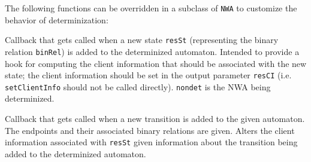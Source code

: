 The following functions can be overridden in a subclass of \texttt{NWA} to
customize the behavior of determinization:
\begin{functionlist}
  Callback that gets called when a new state \texttt{resSt} (representing the
  binary relation \texttt{binRel}) is added to the determinized automaton.
  Intended to provide a hook for computing the client information that should
  be associated with the new state; the client information should be set in
  the output parameter \texttt{resCI} (i.e. \texttt{setClientInfo} should not
  be called directly). \texttt{nondet} is the NWA being determinized.

    Callback that gets called when a new transition is added to the given
    automaton. The endpoints and their associated binary relations are
    given.
    Alters the client information associated with \texttt{resSt} given
    information about the transition being added to the determinized
    automaton.
 \end{functionlist}

